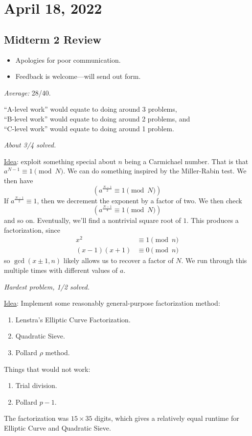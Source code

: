 \section{April 18, 2022}
\subsection{Midterm 2 Review}
\begin{itemize}
    \item Apologies for poor communication.
    \item Feedback is welcome---will send out form.
\end{itemize}
\emph{Average:} 28/40.

``A-level work'' would equate to doing around 3 problems, \\
``B-level work'' would equate to doing around 2 problems, and \\
``C-level work'' would equate to doing around 1 problem.


\begin{problem}
\emph{About 3/4 solved.}

\ul{Idea}: exploit something special about $n$ being a Carmichael number. That is that $a^{N-1}\equiv 1\pmod{N}$. We can do something inspired by the Miller-Rabin test. We then have
\[\left( a^{\frac{N-1}{2}}\equiv 1\pmod{N} \right)\]
If $a^{\frac{N-1}{2}}\equiv 1$, then we decrement the exponent by a factor of two. We then check
\[\left( a^{\frac{N-1}{4}}\equiv 1\pmod{N} \right)\]
and so on. Eventually, we'll find a nontrivial square root of $1$. This produces a factorization, since
\begin{align*}
    x^2        & \equiv 1\pmod{n} \\
    (x-1)(x+1) & \equiv 0\pmod{n}
\end{align*}
so $\gcd(x\pm 1, n)$ likely allows us to recover a factor of $N$. We run through this multiple times with different values of $a$.
\end{problem}

\begin{problem}
\emph{Hardest problem, 1/2 solved.}

\ul{Idea}: Implement some reasonably general-purpose factorization method:
\begin{enumerate}
    \item Lenstra's Elliptic Curve Factorization.
    \item Quadratic Sieve.
    \item Pollard $\rho$ method.
\end{enumerate}

Things that would not work:
\begin{enumerate}
    \item Trial division.
    \item Pollard $p-1$.
\end{enumerate}

The factorization was $15\times 35$ digits, which gives a relatively equal runtime for Elliptic Curve and Quadratic Sieve.
\end{problem}

